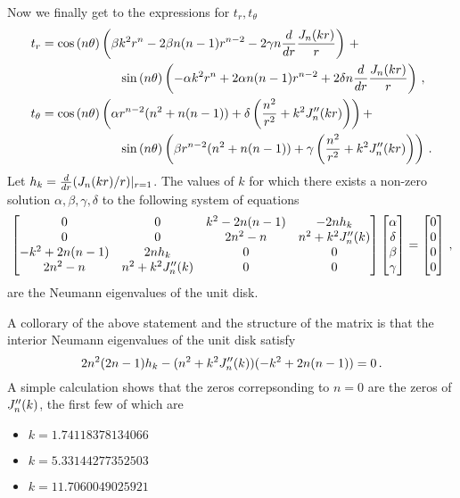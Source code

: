 Now we finally get to the expressions for $t_{r},t_{\theta}$ 
\begin{equation}
\begin{aligned}
t_{r} &= \cost \left( \beta k^2 r^{n} -2\beta n(n-1)r^{n-2} - 2\gamma n \ddr \frac{\jnkr}{r}  \right) \, + \\
& \hspace*{15ex} \sint \left(-\alpha k^2 r^{n} + 2 \alpha n(n-1)r^{n-2} + 2 \delta n \ddr \frac{\jnkr}{r} \right) \, , \\
t_{\theta} &= \cost \left( \alpha r^{n-2} (n^2 + n(n-1)) + \delta \left( \frac{n^2}{r^2} + k^2 \jnppkr \right)  \right) + \\
& \hspace*{15ex} \sint \left( \beta r^{n-2} (n^2 + n(n-1)) + \gamma \left( \frac{n^2}{r^2} + k^2 \jnppkr \right) \right) \, .
\end{aligned}
\end{equation}
Let $h_{k} = \frac{d}{dr} (J_{n}(kr)/r)|_{r=1}$.
The values of $k$ for which there exists a non-zero solution $\alpha,\beta,\gamma,\delta$ 
to the following system of equations
\begin{equation}
\begin{bmatrix}
0 & 0 & k^2 - 2n(n-1) & -2nh_{k} \\
0 & 0 & 2n^2 -n & n^2 + k^2 J_{n}''(k) \\
-k^2 + 2n(n-1) & 2nh_{k} & 0 & 0 \\
2n^2 -n & n^2 + k^2 J_{n}''(k) & 0 & 0
\end{bmatrix}
\begin{bmatrix}
\alpha \\ \delta \\ \beta \\ \gamma
\end{bmatrix}
=
\begin{bmatrix}
0 \\ 0 \\ 0 \\ 0
\end{bmatrix}
\, ,
\end{equation}
are the Neumann eigenvalues of the unit disk.

A collorary of the above statement and the structure of the matrix is that
the interior Neumann eigenvalues of the unit disk satisfy
\begin{equation}
2n^2(2n-1)h_{k} - (n^2 + k^2 J_{n}''(k))(-k^2 + 2n(n-1)) = 0 \, .
\end{equation}
A simple calculation shows that the zeros correpsonding to
$n=0$ are the zeros of $J_{n}''(k)$, the first few of which are
\begin{itemize}
\item $k = 1.74118378134066$
\item $k = 5.33144277352503$
\item $k = 11.7060049025921$
\end{itemize}
